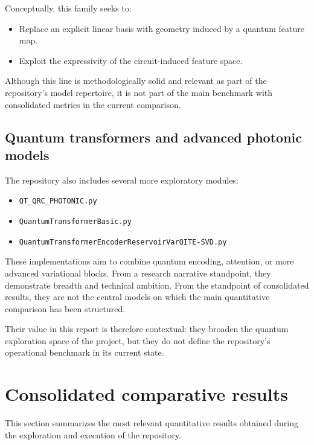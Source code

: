 \documentclass[11pt,a4paper]{article}
\begin{document}
Conceptually, this family seeks to:

\begin{itemize}
    \item Replace an explicit linear basis with geometry induced by a quantum feature map.
    \item Exploit the expressivity of the circuit-induced feature space.
\end{itemize}

Although this line is methodologically solid and relevant as part of the repository’s model repertoire, it is not part of the main benchmark with consolidated metrics in the current comparison.

\subsection{Quantum transformers and advanced photonic models}

The repository also includes several more exploratory modules:

\begin{itemize}
    \item \texttt{QT\_QRC\_PHOTONIC.py}
    \item \texttt{QuantumTransformerBasic.py}
    \item \texttt{QuantumTransformerEncoderReservoirVarQITE-SVD.py}
\end{itemize}

These implementations aim to combine quantum encoding, attention, or more advanced variational blocks. From a research narrative standpoint, they demonstrate breadth and technical ambition. From the standpoint of consolidated results, they are not the central models on which the main quantitative comparison has been structured.

Their value in this report is therefore contextual: they broaden the quantum exploration space of the project, but they do not define the repository’s operational benchmark in its current state.

\section{Consolidated comparative results}

This section summarizes the most relevant quantitative results obtained during the exploration and execution of the repository.
\end{document}
